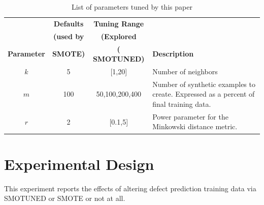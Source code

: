 \documentclass[10pt,conference]{IEEEtran}
\theoremstyle{break}
\theoremstyle{break}
\begin{document}


\begin{table}[!t]
    \begin{center}
\scriptsize
\begin{tabular}{c|c|c|p{3cm}} 
        \textbf{} & \textbf{Defaults} & \textbf{Tuning Range} & \\
          & \textbf{(used by  } & \textbf{(Explored  } &  \\  
        \textbf{Parameter} & \textbf{ SMOTE)} & \textbf{( SMOTUNED)} &  \textbf{Description} \\
          
          
        \hline
        $k$ & 5 & [1,20] & Number of neighbors \\ 
        \hline
       $m$ & 100 & {50,100,200,400} & Number of synthetic examples to create. Expressed as a percent  of   final training data. \\ 
        \hline
        $r$ & 2 & [0.1,5] & Power parameter for the Minkowski distance metric.\\
 
\end{tabular}
\end{center}
\caption{List of parameters tuned by this paper}
\label{tb:tuned}
\end{table}

\section{Experimental Design}
\label{sect:experiment}
 
This experiment  reports the effects of altering defect prediction
training
data   via SMOTUNED or SMOTE or not at all. 
 
\end{document}
